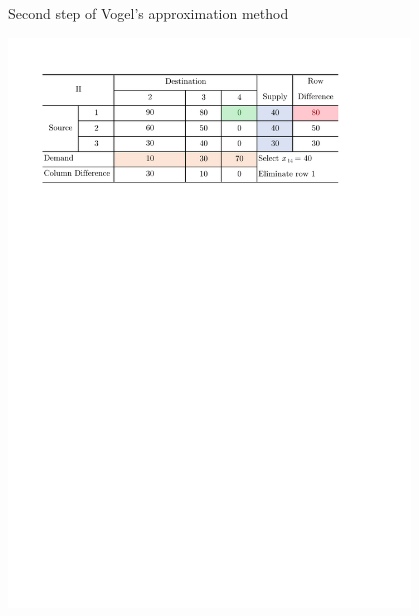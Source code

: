 \documentclass[a4paper]{article}
\begin{document}
\begin{enumerate}
\begin{enumerate}
\begin{solution}
	\begin{table}[H]
		\caption{Second step of Vogel's approximation method}
		\label{tabVO2}
		\centering
		\includegraphics[width = 0.8\textwidth]{VO2}				
	\end{table}


\end{solution}
\end{enumerate}
\end{enumerate}
\end{document}
